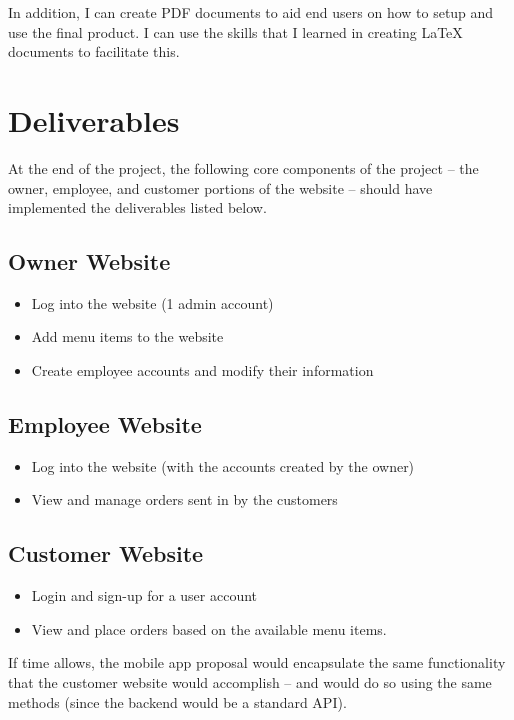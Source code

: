 \documentclass[letterpaper,11pt]{../templates/texMemo}
\newenvironment{notebox}
{\begin{tcolorbox}[colback=blue!5!white,colframe=blue!75!black,title={\faIcon{info-circle}\hspace{2.5mm}\textbf{Note:}}]}
{\end{tcolorbox}}
\begin{document}
    In addition, I can create PDF documents to aid end users on how to setup and use the final product. I can use the skills that I learned in creating {\LaTeX} documents to facilitate this.


    \section{Deliverables}
    At the end of the project, the following core components of the project -- the owner, employee, and customer portions of the website -- should have implemented the deliverables listed below.

    \subsection{Owner Website}
    \begin{itemize}
        \item Log into the website (1 admin account)
        \item Add menu items to the website
        \item Create employee accounts and modify their information
    \end{itemize}

    \subsection{Employee Website}
    \begin{itemize}
        \item Log into the website (with the accounts created by the owner)
        \item View and manage orders sent in by the customers
    \end{itemize}

    \subsection{Customer Website}
    \begin{itemize}
        \item Login and sign-up for a user account
        \item View and place orders based on the available menu items.
    \end{itemize}

    \begin{notebox}
        If time allows, the mobile app proposal would encapsulate the same functionality that the customer website would accomplish -- and would do so using the same methods (since the backend would be a standard API).
    \end{notebox}
\end{document}
